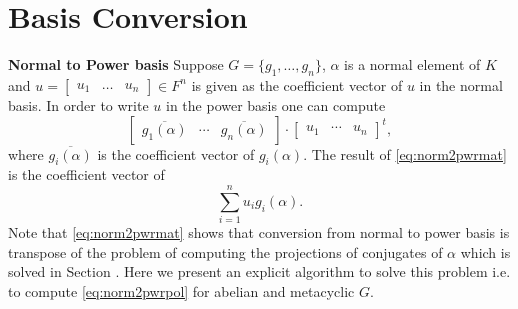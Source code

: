 \section{Basis Conversion}

\textbf{Normal to Power basis}
Suppose $G = \lbrace g_1, \ldots, g_n \rbrace$, $\alpha$ is a normal element of $K$ and $u = \begin{bmatrix}u_1 & \ldots & u_n \end{bmatrix} \in F^n$ is given as the coefficient vector of $u$ in the normal basis.
In order to write $u $ in the power basis one can compute 
\begin{equation}\label{eq:norm2pwrmat}
\left[\begin{array}{c|c|c}
\overline{g_1(\alpha)} & \cdots & \overline{g_n(\alpha)} 
\end{array}\right]\cdot 
\begin{bmatrix}
u_1 & \cdots & u_n
\end{bmatrix}^t,
\end{equation}
where $\overline{g_i(\alpha)}$ is the coefficient vector of $g_i(\alpha)$. The result of \eqref{eq:norm2pwrmat} is the coefficient vector of
\begin{equation}\label{eq:norm2pwrpol}
\sum_{i = 1}^n u_i g_i(\alpha).
\end{equation}
Note that \eqref{eq:norm2pwrmat} shows that conversion from normal to power basis is transpose of the problem of computing the projections of 
conjugates of $\alpha$ which is solved in Section \label{sec:osum}. Here we present an explicit algorithm to solve this problem i.e. to compute
\eqref{eq:norm2pwrpol} for abelian and metacyclic $G$.


